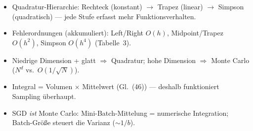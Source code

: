\begin{merkbox}
\begin{itemize}[itemsep=1pt]
  \item Quadratur-Hierarchie: Rechteck (konstant) $\to$ Trapez (linear) $\to$
        Simpson (quadratisch) --- jede Stufe erfasst mehr Funktionsverhalten.
  \item Fehlerordnungen (akkumuliert): Left/Right $O(h)$, Midpoint/Trapez $O(h^2)$,
        Simpson $O(h^4)$ (Tabelle~3).
  \item Niedrige Dimension + glatt $\Rightarrow$ Quadratur; hohe Dimension
        $\Rightarrow$ Monte Carlo ($N^d$ vs.\ $O(1/\sqrt{N})$).
  \item Integral = Volumen $\times$ Mittelwert (Gl.~(46)) --- deshalb funktioniert
        Sampling überhaupt.
  \item SGD \emph{ist} Monte Carlo: Mini-Batch-Mittelung = numerische Integration;
        Batch-Grö{\ss}e steuert die Varianz ($\sim 1/b$).
\end{itemize}
\end{merkbox}
